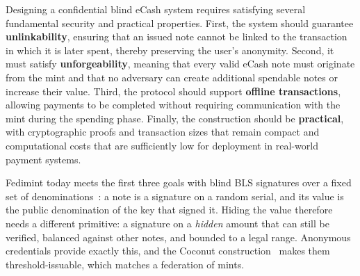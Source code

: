 \documentclass[10pt,a5paper]{article}
\begin{document}
Designing a confidential blind eCash system requires satisfying several
fundamental security and practical properties. First, the system should
guarantee \textbf{unlinkability}, ensuring that an issued note cannot be linked
to the transaction in which it is later spent, thereby preserving the user's
anonymity. Second, it must satisfy \textbf{unforgeability}, meaning that every
valid eCash note must originate from the mint and that no adversary can create
additional spendable notes or increase their value. Third, the protocol should
support \textbf{offline transactions}, allowing payments to be completed
without requiring communication with the mint during the spending phase.
Finally, the construction should be \textbf{practical}, with cryptographic
proofs and transaction sizes that remain compact and computational costs that
are sufficiently low for deployment in real-world payment systems.

Fedimint today meets the first three goals with blind BLS signatures over a
fixed set of denominations~\cite{fedimint}: a note is a signature on a random
serial, and its value is the public denomination of the key that signed it.
Hiding the value therefore needs a different primitive: a signature on a
\emph{hidden} amount that can still be verified, balanced against other notes,
and bounded to a legal range. Anonymous credentials provide exactly this, and
the Coconut construction~\cite{coconut} makes them threshold-issuable, which
matches a federation of mints.
\end{document}
